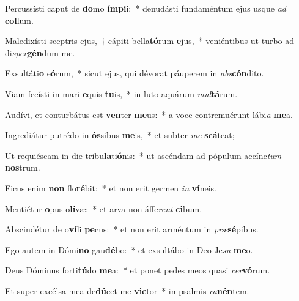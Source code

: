 \item Percussísti caput de \textbf{do}mo \textbf{ím}\textbf{pi}i:~* denudásti fundaméntum ejus usque \textit{ad} \textbf{col}lum.
\item Maledixísti sceptris ejus,~† cápiti bella\textbf{tó}rum \textbf{e}jus,~* veniéntibus ut turbo ad di\textit{sper}\textbf{gén}dum me.
\item Exsultáti\textbf{o} e\textbf{ó}rum,~* sicut ejus, qui dévorat páuperem in \textit{abs}\textbf{cón}dito.
\item Viam fecísti in mari \textbf{e}quis \textbf{tu}is,~* in luto aquárum \textit{mul}\textbf{tá}rum.
\item Audívi, et conturbátus est \textbf{ven}ter \textbf{me}us:~* a voce contremuérunt lábi\textit{a} \textbf{me}a.
\item Ingrediátur putrédo in \textbf{ós}sibus \textbf{me}is,~* et subter \textit{me} \textbf{scá}teat;
\item Ut requiéscam in die tribu\textbf{la}ti\textbf{ó}nis:~* ut ascéndam ad pópulum accínc\textit{tum} \textbf{nos}trum.
\item Ficus enim \textbf{non} flo\textbf{ré}bit:~* et non erit germen \textit{in} \textbf{ví}neis.
\item Mentiétur \textbf{o}pus o\textbf{lí}væ:~* et arva non áffe\textit{rent} \textbf{ci}bum.
\item Abscindétur de o\textbf{ví}li \textbf{pe}cus:~* et non erit arméntum in \textit{præ}\textbf{sé}pibus.
\item Ego autem in Dómi\textbf{no} gau\textbf{dé}bo:~* et exsultábo in Deo Je\textit{su} \textbf{me}o.
\item Deus Dóminus forti\textbf{tú}do \textbf{me}a:~* et ponet pedes meos quasi \textit{cer}\textbf{vó}rum.
\item Et super excélsa mea de\textbf{dú}cet me \textbf{vic}tor~* in psalmis \textit{ca}\textbf{nén}tem.
